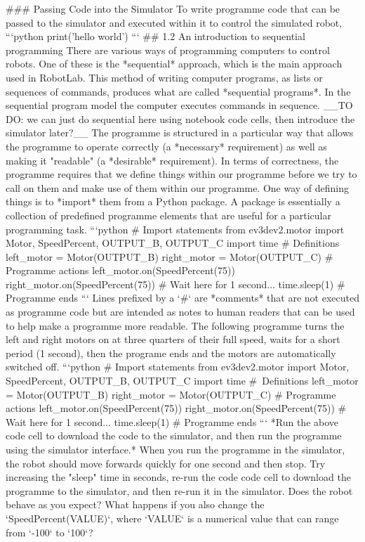 \documentclass[letterpaper,10pt,english]{sphinxmanual}
\begin{document}
{### Passing Code into the Simulator
To write programme code that can be passed to the simulator and executed within it to control the simulated robot,
```python
print('hello world')
```
## 1.2 An introduction to sequential programming
There are various ways of programming computers to control robots. One of these is the *sequential* approach, which is the main approach used in RobotLab. This method of writing computer programs, as lists or sequences of commands, produces what are called *sequential programs*.
In the sequential program model the computer executes commands in sequence.
__TO DO: we can just do sequential here using notebook code cells, then introduce the simulator later?__
The programme is structured in a particular way that allows the programme to operate correctly (a *necessary* requirement) as well as making it "readable" (a *desirable* requirement).
In terms of correctness, the programme requires that we define things within our programme before we try to call on them and make use of them within our programme.
One way of defining things is to *import* them from a Python package. A package is essentially a collection of predefined programme elements that are useful for a particular programming task.
```python
# Import statements
from ev3dev2.motor import Motor, SpeedPercent, OUTPUT_B, OUTPUT_C
import time
# Definitions
left_motor = Motor(OUTPUT_B)
right_motor = Motor(OUTPUT_C)
# Programme actions
left_motor.on(SpeedPercent(75))
right_motor.on(SpeedPercent(75))
# Wait here for 1 second...
time.sleep(1)
# Programme ends
```
Lines prefixed by a `#` are *comments* that are not executed as programme code but are intended as notes to human readers that can be used to help make a programme more readable.
The following programme turns the left and right motors on at three quarters of their full speed, waits for a short period (1 second), then the programe ends and the motors are automatically switched off.
```python
# Import statements
from ev3dev2.motor import Motor, SpeedPercent, OUTPUT_B, OUTPUT_C
import time
# Definitions
left_motor = Motor(OUTPUT_B)
right_motor = Motor(OUTPUT_C)
# Programme actions
left_motor.on(SpeedPercent(75))
right_motor.on(SpeedPercent(75))
# Wait here for 1 second...
time.sleep(1)
# Programme ends
```
*Run the above code cell to download the code to the simulator, and then run the programme using the simulator interface.*
When you run the programme in the simulator, the robot should move forwards quickly for one second and then stop. Try increasing the "sleep" time in seconds, re-run the code code cell to download the programme to the simulator, and then re-run it in the simulator. Does the robot behave as you expect? What happens if you also change the `SpeedPercent(VALUE)`, where `VALUE` is a numerical value that can range from `-100` to `100`?
}
\end{document}
